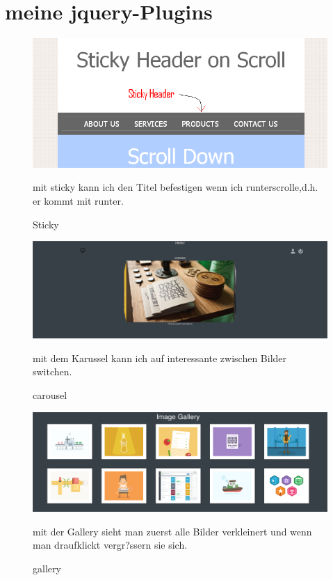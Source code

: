 \documentclass{article}
\begin{document}
\section{meine jquery-Plugins}

\begin{figure}[ht]
    \centering
    \includegraphics[width=.6\linewidth]{sticky}
    \caption{Sticky}
    \label{fig:sub1}{mit sticky kann ich den Titel befestigen wenn ich runterscrolle,d.h. er kommt mit runter.}
    \end{figure}

    \begin{figure}[ht]
        \centering
        \includegraphics[width=.6\linewidth]{carousel}
        \caption{carousel}
        \label{fig:sub1}{mit dem Karussel kann ich auf interessante zwischen Bilder switchen.}
        \end{figure}

        \begin{figure}[ht]
            \centering
            \includegraphics[width=.6\linewidth]{gallery}
            \caption{gallery}
            \label{fig:sub1}{mit der Gallery sieht man zuerst alle Bilder verkleinert und wenn man draufklickt vergr?ssern sie sich.}
            \end{figure}
\end{document}

